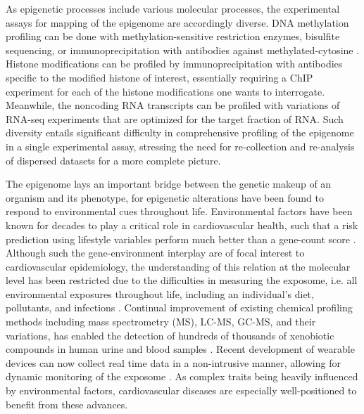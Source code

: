 \documentclass[letter]{bioinfo}
\begin{document}
	
	As epigenetic processes include various molecular processes, the experimental assays for mapping of the epigenome are accordingly diverse. DNA methylation profiling can be done with methylation-sensitive restriction enzymes, bisulfite sequencing, or immunoprecipitation with antibodies against methylated-cytosine \citep{Bibikova:2010:Genomewide}. Histone modifications can be profiled by immunoprecipitation with antibodies specific to the modified histone of interest, essentially requiring a ChIP experiment for each of the histone modifications one wants to interrogate. Meanwhile, the noncoding RNA transcripts can be profiled with variations of RNA-seq experiments that are optimized for the target fraction of RNA. Such diversity entails significant difficulty in comprehensive profiling of the epigenome in a single experimental assay, stressing the need for re-collection and re-analysis of dispersed datasets for a more complete picture.
	
	The epigenome lays an important bridge between the genetic makeup of an organism and its phenotype, for epigenetic alterations have been found to respond to environmental cues throughout life. Environmental factors have been known for decades to play a critical role in cardiovascular health, such that a risk prediction using lifestyle variables perform much better than a gene-count score \citep{Joyner:2011:Ten}. Although such the gene-environment interplay are of focal interest to cardiovascular epidemiology,  the understanding of this relation at the molecular level has been restricted due to the difficulties in measuring the exposome, i.e. all environmental exposures throughout life, including an individual's diet, pollutants, and infections \citep{Wild:2005:Complementing}. Continual improvement of existing chemical profiling methods including mass spectrometry (MS), LC-MS, GC-MS, and their variations, has enabled the detection of hundreds of thousands of xenobiotic compounds in human urine and blood samples \citep{Warth:2017:ExposomeScale}.
	Recent development of wearable devices can now collect real time data in a non-intrusive manner, allowing for dynamic monitoring of the exposome \citep{Jiang:2018:Dynamic}. As complex traits being heavily influenced by environmental factors, cardiovascular diseases are especially well-positioned to benefit from these advances.
	
\end{document}
